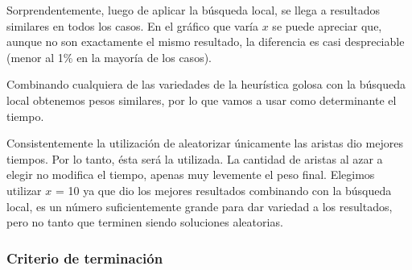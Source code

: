 \vspace*{0.5cm}

Sorprendentemente, luego de aplicar la búsqueda local, se llega a resultados
similares en todos los casos. En el gráfico que varía $x$ se puede apreciar
que, aunque no son exactamente el mismo resultado, la diferencia es casi
despreciable (menor al 1\% en la mayoría de los casos).


Combinando cualquiera de las variedades de la heurística golosa con la
búsqueda local obtenemos pesos similares, por lo que vamos a usar como
determinante el tiempo.

Consistentemente la utilización de aleatorizar únicamente las aristas dio
mejores tiempos. Por lo tanto, ésta será la utilizada. La cantidad de
aristas al azar a elegir no modifica el tiempo, apenas muy levemente el peso
final. Elegimos utilizar $x$ = 10 ya que dio los mejores resultados combinando
con la búsqueda local, es un número suficientemente grande para dar variedad a
los resultados, pero no tanto que terminen siendo soluciones aleatorias.

\subsubsection{Criterio de terminación}

